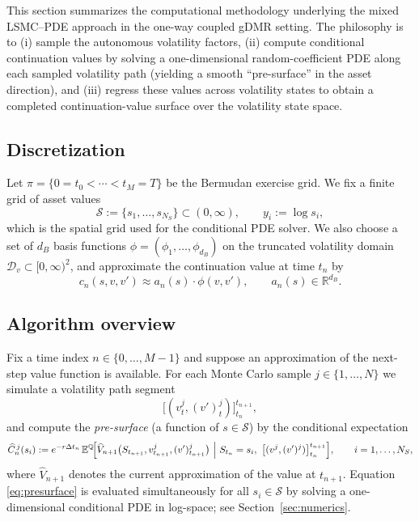 \documentclass[10pt]{article}
\theoremstyle{plain}
\theoremstyle{definition}
\theoremstyle{remark}
\newcommand{\E}{\mathbb E}
\newcommand{\Q}{\mathbb Q}
\newcommand{\R}{\mathbb R}
\begin{document}
This section summarizes the computational methodology underlying the mixed LSMC--PDE approach in the
one-way coupled gDMR setting. The philosophy is to (i) sample the autonomous volatility factors,
(ii) compute conditional continuation values by solving a one-dimensional random-coefficient PDE along each sampled
volatility path (yielding a smooth ``pre-surface'' in the asset direction), and (iii) regress these values across
volatility states to obtain a completed continuation-value surface over the volatility state space.

\subsection{Discretization}

Let $\pi=\{0=t_0<\cdots<t_M=T\}$ be the Bermudan exercise grid.
We fix a finite grid of asset values
\[
\mathscr S:=\{s_1,\dots,s_{N_S}\}\subset(0,\infty),
\qquad y_i:=\log s_i,
\]
which is the spatial grid used for the conditional PDE solver.
We also choose a set of $d_B$ basis functions $\phi=(\phi_1,\dots,\phi_{d_B})$ on the truncated volatility domain
$\mathcal D_v\subset[0,\infty)^2$, and approximate the continuation value at time $t_n$ by
\[
c_n(s,v,v') \approx a_n(s)\cdot \phi(v,v'),
\qquad a_n(s)\in\R^{d_B}.
\]

\subsection{Algorithm overview}

Fix a time index $n\in\{0,\dots,M-1\}$ and suppose an approximation of the next-step value function is available.
For each Monte Carlo sample $j\in\{1,\dots,N\}$ we simulate a volatility path segment
\[
\bigl[(v^{j}_t, (v')^{j}_t)\bigr]_{t_n}^{t_{n+1}},
\]
and compute the \emph{pre-surface} (a function of $s\in\mathscr S$) by the conditional expectation
\begin{equation}\label{eq:presurface}
\widehat C^{\,j}_n(s_i)
:= e^{-r\Delta t_n}\,
\E^\Q\!\Bigl[
\widehat V_{n+1}\bigl(S_{t_{n+1}},v^{j}_{t_{n+1}},(v')^{j}_{t_{n+1}}\bigr)
\ \Big|\ S_{t_n}=s_i,\ \bigl[(v^{j},(v')^{j})\bigr]_{t_n}^{t_{n+1}}
\Bigr],
\qquad i=1,\dots,N_S,
\end{equation}
where $\widehat V_{n+1}$ denotes the current approximation of the value at $t_{n+1}$.
Equation \eqref{eq:presurface} is evaluated simultaneously for all $s_i\in\mathscr S$ by solving a one-dimensional
conditional PDE in log-space; see Section~\ref{sec:numerics}.
\end{document}
